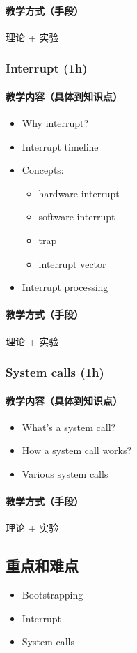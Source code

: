 \documentclass[11pt]{article}
\begin{document}
\paragraph{教学方式（手段）}
\label{sec-1-2-4-2}
理论 + 实验
\subsubsection{Interrupt (1h)}
\label{sec-1-2-5}
\paragraph{教学内容（具体到知识点）}
\label{sec-1-2-5-1}
\begin{itemize}
\item Why interrupt?
\item Interrupt timeline
\item Concepts: 
\begin{itemize}
\item hardware interrupt
\item software interrupt
\item trap
\item interrupt vector
\end{itemize}
\item Interrupt processing
\end{itemize}
\paragraph{教学方式（手段）}
\label{sec-1-2-5-2}
理论 + 实验
\subsubsection{System calls (1h)}
\label{sec-1-2-6}
\paragraph{教学内容（具体到知识点）}
\label{sec-1-2-6-1}
\begin{itemize}
\item What's a system call?
\item How a system call works?
\item Various system calls
\end{itemize}
\paragraph{教学方式（手段）}
\label{sec-1-2-6-2}
理论 + 实验
\subsection{重点和难点}
\label{sec-1-3}
\begin{itemize}
\item Bootstrapping
\item Interrupt
\item System calls
\end{itemize}
\end{document}
